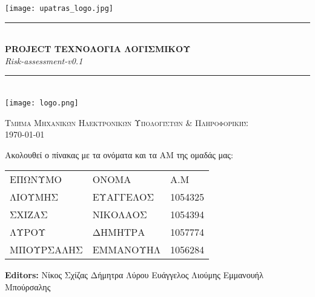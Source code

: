\documentclass[12pt,a4paper,oneside]{article}
\newcommand{\HRule}{\rule{\linewidth}{0.5mm}}
\begin{document}
\renewcommand{\contentsname}{Περιεχόμενα}

\renewcommand{\refname}{Αναφορές}

\begin{titlepage}
\begin{center}

\texttt{[image: upatras\_logo.jpg]}~\\[2cm]


\HRule \\[0.4cm]
{ \LARGE 
  \textbf{PROJECT TΕΧΝΟΛΟΓΙΑ ΛΟΓΙΣΜΙΚΟΥ}\\[0.4cm]
  \emph{Risk-assessment-v0.1}\\[0.4cm]
}
\HRule \\[1.5cm]



{ \large
  \texttt{[image: logo.png]}~\\[2cm]
 
}

\vfill

\textsc{\large Τμήμα Μηχανικών Ηλεκτρονικών Υπολογιστών \& Πληροφορικής}\\[0.4cm]


{\large {}\today}
 
\end{center}
\end{titlepage}
\pagestyle{fancy}
\centering
Ακολουθεί ο πίνακας με τα ονόματα και τα ΑΜ της ομαδάς μας:

\centering
\begin{tabular}{ |p{4cm}|p{4cm}|p{3cm}|}
\arrayrulecolor{gray}
 \hline
 \multicolumn{3}{|c|}{Μέλη} \\
 \hline
 ΕΠΩΝΥΜΟ& ΟΝΟΜΑ & Α.M\\
 \hline
 ΛΙΟΥΜΗΣ   & ΕΥΑΓΓΕΛΟΣ    & 1054325\\
 ΣΧΙΖΑΣ &  ΝΙΚΟΛΑΟΣ & 1054394\\
 ΛΥΡΟΥ & ΔΗΜΗΤΡΑ & 1057774\\
 ΜΠΟΥΡΣΑΛΗΣ   & ΕΜΜΑΝΟΥΗΛ & 1056284\\
\hline 

\end{tabular}


\vspace{7cm}
\raggedright
\textbf{Editors:}
\newline
Νίκος Σχίζας
\newline
Δήμητρα Λύρου
\newline
Ευάγγελος Λιούμης
\newline
Εμμανουήλ Μπούρσαλης
\end{document}
